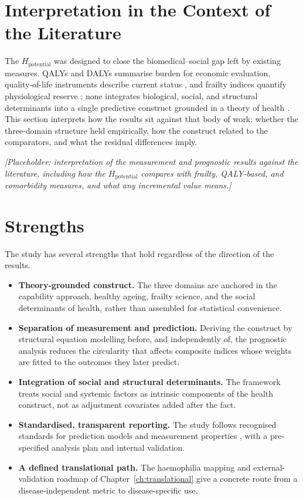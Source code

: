\section{Interpretation in the Context of the Literature}
\noindent The $H_{\text{potential}}$ was designed to close the biomedical--social gap left by existing measures. QALYs and DALYs summarise burden for economic evaluation, quality-of-life instruments describe current status \citep{whitehead_2010}, and frailty indices quantify physiological reserve \citep{searle_2008}; none integrates biological, social, and structural determinants into a single predictive construct grounded in a theory of health \citep{sen_1993, who_2015_ageing, marmot_2005}. This section interprets how the results sit against that body of work: whether the three-domain structure held empirically, how the construct related to the comparators, and what the residual differences imply.

\medskip
\noindent\emph{[Placeholder: interpretation of the measurement and prognostic results against the literature, including how the $H_{\text{potential}}$ compares with frailty, QALY-based, and comorbidity measures, and what any incremental value means.]}

\section{Strengths}
\noindent The study has several strengths that hold regardless of the direction of the results.
\begin{itemize}
  \item \textbf{Theory-grounded construct.} The three domains are anchored in the capability approach, healthy ageing, frailty science, and the social determinants of health, rather than assembled for statistical convenience.
  \item \textbf{Separation of measurement and prediction.} Deriving the construct by structural equation modelling before, and independently of, the prognostic analysis reduces the circularity that affects composite indices whose weights are fitted to the outcomes they later predict.
  \item \textbf{Integration of social and structural determinants.} The framework treats social and systemic factors as intrinsic components of the health construct, not as adjustment covariates added after the fact.
  \item \textbf{Standardised, transparent reporting.} The study follows recognised standards for prediction models and measurement properties \citep{collins_2024, moons_2019}, with a pre-specified analysis plan and internal validation.
  \item \textbf{A defined translational path.} The haemophilia mapping and external-validation roadmap of Chapter~\ref{ch:translational} give a concrete route from a disease-independent metric to disease-specific use.
\end{itemize}

